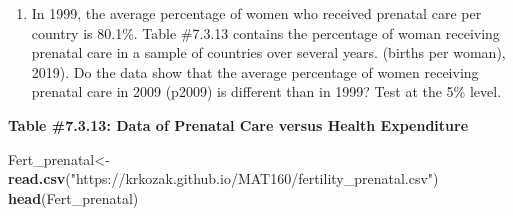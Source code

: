 \documentclass[
]{book}
\newenvironment{Shaded}{\begin{snugshade}}{\end{snugshade}}
\newcommand{\KeywordTok}[1]{\textcolor[rgb]{0.13,0.29,0.53}{\textbf{#1}}}
\newcommand{\NormalTok}[1]{#1}
\newcommand{\StringTok}[1]{\textcolor[rgb]{0.31,0.60,0.02}{#1}}
\providecommand{\tightlist}{%
  \setlength{\itemsep}{0pt}\setlength{\parskip}{0pt}}
\begin{document}
\begin{enumerate}
\def\labelenumi{\arabic{enumi}.}
\setcounter{enumi}{5}
\tightlist
\item
  In 1999, the average percentage of women who received prenatal care per country is 80.1\%. Table \#7.3.13 contains the percentage of woman receiving prenatal care in a sample of countries over several years. (births per woman), 2019). Do the data show that the average percentage of women receiving prenatal care in 2009 (p2009) is different than in 1999? Test at the 5\% level.
\end{enumerate}

\textbf{Table \#7.3.13: Data of Prenatal Care versus Health Expenditure}

\begin{Shaded}
\begin{Highlighting}[]
\NormalTok{Fert_prenatal<-}\StringTok{ }\KeywordTok{read.csv}\NormalTok{(}\StringTok{"https://krkozak.github.io/MAT160/fertility_prenatal.csv"}\NormalTok{)}
\KeywordTok{head}\NormalTok{(Fert_prenatal)}
\end{Highlighting}
\end{Shaded}
\end{document}
